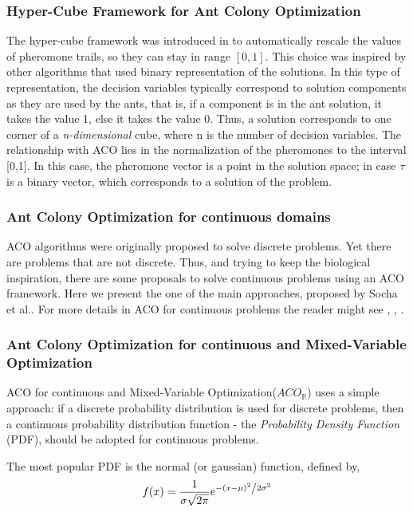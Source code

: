 					\subsubsection*{Hyper-Cube Framework for Ant Colony Optimization}
					The hyper-cube framework was introduced in \cite{blum04} to automatically rescale the values of pheromone trails, so they can stay in range $[0,1]$. This choice was inspired by other algorithms that used binary representation of the solutions. In this type of representation, the decision variables typically correspond to solution components as they are used by the ants, that is, if a component is in the ant solution, it takes the value 1, else it takes the value 0. Thus, a solution corresponds to one corner of a \emph{n-dimensional} cube, where n is the number of decision variables.
					The relationship with ACO lies in the normalization of the pheromones to the interval [0,1]. In this case, the pheromone vector is a point in the solution space; in case $\tau$ is a binary vector, which corresponds to a solution of the problem.
					
					\subsubsection*{Ant Colony Optimization for continuous domains}
					ACO algorithms were originally proposed to solve discrete problems. Yet there are problems that are not discrete. Thus, and trying to keep the biological inspiration, there are some proposals to solve continuous problems using an ACO framework. 
					Here we present the one of the main approaches, proposed by Socha et al.\cite{socha04}. For more details in ACO for continuous problems the reader might see \cite{bilchev95}, \cite{tsutsui04}, \cite{kong06}.
					
					
					\subsubsection*{Ant Colony Optimization for continuous and Mixed-Variable Optimization}
					 ACO for continuous and Mixed-Variable Optimization($ACO_\mathbb{R}$) uses a simple approach: if a discrete probability distribution is used for discrete problems, then a continuous probability distribution function - the \emph{Probability Density Function} (PDF), should be adopted for continuous problems.

					The most popular PDF is the normal (or gaussian) function, defined by,
						\begin{equation}
							f(x) = \frac{1}{{\sigma \sqrt {2\pi } }}e^{{{ - \left( {x - \mu } \right)^2 } \mathord{\left/ 				{\vphantom {{ - \left( {x - \mu } \right)^2 } {2\sigma ^2 }}} \right. \kern-\nulldelimiterspace} {2\sigma ^2 }}}
						\end{equation}


